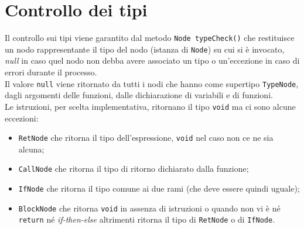 \documentclass[../main]{subfiles}
\begin{document}
\section{Controllo dei tipi}
Il controllo sui tipi viene garantito dal metodo \verb|Node typeCheck()| che restituisce un nodo rappresentante il tipo del nodo (istanza di \verb|Node|) su cui si è invocato, 
\textit{null} in caso quel nodo non debba avere associato un tipo o  un'eccezione in caso di errori durante il processo.\\
Il valore \verb|null| viene ritornato da tutti i nodi che hanno come supertipo \verb|TypeNode|, dagli argomenti delle funzioni, dalle dichiarazione di variabili e di funzioni.\\
Le istruzioni, per scelta implementativa, ritornano il tipo \verb|void| ma ci sono alcune eccezioni:
    \begin{itemize}
        \item \verb|RetNode| che ritorna il tipo dell'espressione, \verb|void| nel caso non ce ne sia alcuna;
        \item \verb|CallNode| che ritorna il tipo di ritorno dichiarato dalla funzione;
        \item \verb|IfNode| che ritorna il tipo comune ai due rami (che deve essere quindi uguale);
        \item \verb|BlockNode| che ritorna \verb|void| in assenza di istruzioni o quando non vi è n\'e \verb|return| n\'e \textit{if-then-else} altrimenti ritorna il tipo di \verb|RetNode| o di \verb|IfNode|. 
    \end{itemize}

\end{document}

